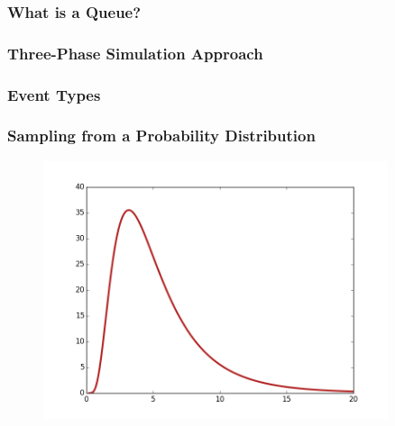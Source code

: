 \documentclass{beamer}
\begin{document}
\begin{frame}
\frametitle{What is a Queue?}
\begin{figure}
  
\end{figure}
\end{frame}


\begin{frame}
\begin{figure}
    
\end{figure}
\end{frame}

\begin{frame}
\frametitle{Three-Phase Simulation Approach}
\begin{figure}
    
\end{figure}
\end{frame}

\begin{frame}
\frametitle{Event Types}
\begin{center}
\begin{figure}
    
\end{figure}
\end{center}
\end{frame}

\begin{frame}
\frametitle{Sampling from a Probability Distribution}
\begin{figure}
    \includegraphics[width=0.9\textwidth]{lognormal}
\end{figure}
\end{frame}
\end{document}
